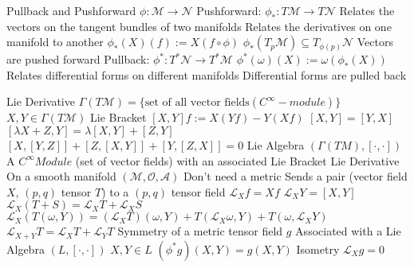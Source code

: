 \documentclass[14pt]{extarticle}
\begin{document}
\begin{outline}
		\1	Pullback and Pushforward
			\2	$\phi : \mathcal{M} \rightarrow \mathcal{N}$
			\2	Pushforward:	$\phi_* : T\mathcal{M} \rightarrow T\mathcal{N}$
				\3	Relates the vectors on the tangent bundles of two manifolds
				\3	Relates the derivatives on one manifold to another
				\3	$\phi_*(X)(f) := X(f \circ \phi)$
				\3	$\phi_*(T_p\mathcal{M}) \subseteq T_{\phi(p)}\mathcal{N}$
				\3	Vectors are pushed forward
			\2	Pullback:	$\phi^* : T^*\mathcal{N} \rightarrow T^*\mathcal{M}$
				\3	$\phi^*(\omega)(X) := \omega(\phi_*(X))$
				\3	Relates differential forms on different manifolds
				\3	Differential forms are pulled back

		\1	Lie Derivative
			\2	$\Gamma(T\mathcal{M}) = \{\text{set of all vector fields}(C^{\infty}-module)\}$
				\3	$X,Y \in \Gamma(T\mathcal{M})$
			\2	Lie Bracket
				\3	$[X,Y]f := X(Yf) - Y(Xf)$
				\3	$[X,Y] = [Y,X]$
				\3	$[\lambda X + Z, Y] = \lambda [X,Y] + [Z,Y]$
				\3	$[X,[Y,Z]] + [Z,[X,Y]] + [Y,[Z,X]] = 0$
			\2	Lie Algebra $(\Gamma(TM),[\cdot,\cdot])$
				\3	A $C^{\infty} Module$ (set of vector fields) with an associated Lie Bracket
			\2	Lie Derivative
				\3	On a smooth manifold $(\mathcal{M},\mathcal{O},\mathcal{A})$
					\4	Don't need a metric
				\3	Sends a pair (vector field $X$, $(p,q)$ tensor $T$) to a $(p,q)$ tensor field
				\3	$\mathcal{L}_Xf = Xf$
				\3	$\mathcal{L}_XY = [X,Y]$	
				\3	$\mathcal{L}_X(T + S) = \mathcal{L}_XT + \mathcal{L}_XS$
				\3	$\mathcal{L}_X(T(\omega,Y)) = (\mathcal{L}_XT)(\omega,Y) + T(\mathcal{L}_X\omega,Y) + T(\omega,\mathcal{L}_XY)$
				\3	$\mathcal{L}_{X + Y} T = \mathcal{L}_XT + \mathcal{L}_YT$
			\2	Symmetry of a metric tensor field $g$
				\3	Associated with a Lie Algebra $(L,[\cdot,\cdot])$
				\3	$X,Y \in L$	
				\3	$(\phi^*g)(X,Y) = g(X,Y)$
				\3	Isometry
				\3	$\mathcal{L}_Xg = 0$
	\end{outline}
\end{document}
